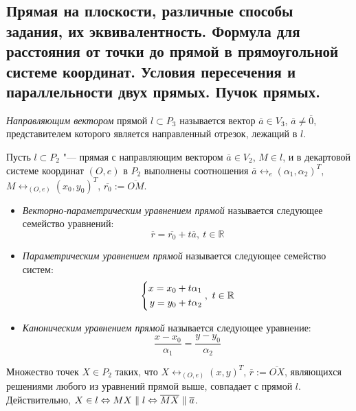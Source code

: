 \subsection{Прямая на плоскости, различные способы задания, их эквивалентность. Формула для расстояния от точки до прямой в прямоугольной системе координат. Условия пересечения и параллельности двух прямых. Пучок прямых.}
    
    \begin{definition}
    	\textit{Направляющим вектором} прямой $l \subset P_3$ называется вектор $\overline{a} \in V_3$, $\overline{a} \ne \overline 0$, представителем которого является направленный отрезок, лежащий в $l$.
    \end{definition}
    
    \begin{definition}
    	Пусть $l \subset P_2$ "--- прямая с направляющим вектором $\overline{a} \in V_2$, $M \in l$, и в декартовой системе координат $(O, e)$ в $P_2$ выполнены соотношения $\overline{a} \leftrightarrow_{e} (\alpha_1, \alpha_2)^T$, $M \leftrightarrow_{(O, e)} (x_0, y_0)^T$, $\overline{r_0} := \overline{OM}$.
    	\begin{itemize}
    		\item \textit{Векторно-параметрическим уравнением прямой} называется следующее семейство уравнений:
    		\[\overline{r} = \overline{r_0} + t\overline{a},~t \in \mathbb{R}\]
    		\item \textit{Параметрическим уравнением прямой} называется следующее семейство систем:
    		\[\left\{
    		\begin{aligned}
    			x = x_0 + t\alpha_1\\
    			y = y_0 + t\alpha_2
    		\end{aligned}
    		\right.,~t \in \mathbb{R}
    		\]
    		\item \textit{Каноническим уравнением прямой} называется следующее уравнение:
    		\[\frac{x - x_0}{\alpha_1} = \frac{y - y_0}{\alpha_2}\]
    	\end{itemize}
    \end{definition}
    
    \begin{note}
    	Множество точек $X \in P_2$ таких, что $X \leftrightarrow_{(O, e)} (x, y)^T$, $\overline{r} := \overline{OX}$, являющихся решениями любого из уравнений прямой выше, совпадает с прямой $l$. Действительно, $X \in l \Leftrightarrow MX \parallel l \Leftrightarrow \overline{MX} \parallel \overline{a}$.
    \end{note}
    
